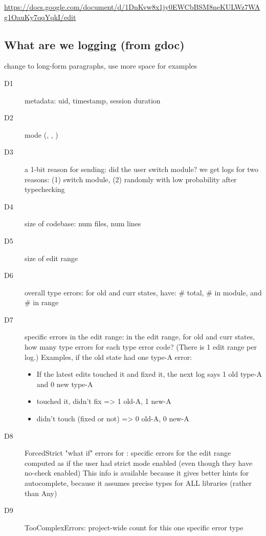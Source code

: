 \documentclass[english,submission,cleveref]{programming}
\begin{document}

\url{https://docs.google.com/document/d/1DnKvw8x1jy0EWCbBSM8neKULWz7WAg1OauKy7qqYqkI/edit}


\subsection{What are we logging (from gdoc)}

\FILL{} change to long-form paragraphs, use more space for examples

\begin{description}
  \item[D1] metadata: uid, timestamp, session duration
  \item[D2] mode (\mnocheck{}, \mnonstrict{}, \mstrict{})
  \item[D3] a 1-bit reason for sending: did the user switch module?
    \subitem we get logs for two reasons: (1) switch module, (2) randomly with
    low probability after typechecking
  \item[D4] size of codebase: num files, num lines
  \item[D5] size of edit range
  \item[D6] overall type errors: for old and curr states, have: \# total, \# in module, and \# in range
  \item[D7] specific errors in the edit range: in the edit range, for old and
    curr states, how many type errors for each type error code? (There is 1
    edit range per log.)
    \subitem Examples, if the old state had one type-A error:
    \begin{itemize}
      \item If the latest edits touched it and fixed it, the next log says 1
        old type-A and 0 new type-A
      \item touched it, didn't fix => 1 old-A, 1 new-A
      \item didn't touch (fixed or not) => 0 old-A, 0 new-A
    \end{itemize}
  \item[D8] ForcedStrict "what if" errors for \mnocheck{}: specific errors for the
    edit range computed as if the user had strict mode enabled (even though they
    have no-check enabled)
    \subitem This info is available because it gives better hints for
    autocomplete, because it assumes precise types for ALL libraries (rather
    than Any)
  \item[D9] TooComplexErrors: project-wide count for this one specific error type
\end{description}
\end{document}
